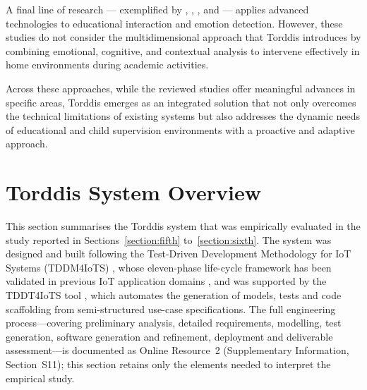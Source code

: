 A final line of research --- exemplified by \cite{Kulkarni2023}, \cite{Enadula2021}, \cite{Ozdamli2022}, and \cite{Warren2015Brief} --- applies advanced technologies to educational interaction and emotion detection. However, these studies do not consider the multidimensional approach that Torddis introduces by combining emotional, cognitive, and contextual analysis to intervene effectively in home environments during academic activities.

Across these approaches, while the reviewed studies offer meaningful advances in specific areas, Torddis emerges as an integrated solution that not only overcomes the technical limitations of existing systems but also addresses the dynamic needs of educational and child supervision environments with a proactive and adaptive approach.


\section{Torddis System Overview}
\label{section:fourth}
This section summarises the Torddis system that was empirically evaluated in the study reported in Sections~\ref{section:fifth} to~\ref{section:sixth}. The system was designed and built following the Test-Driven Development Methodology for IoT Systems (TDDM4IoTS) \citep{Guerrero-Ulloa2020TDDM4IoTS}, whose eleven-phase life-cycle framework has been validated in previous IoT application domains \citep{Guerrero-Ulloa2023Nawi,Guerrero2023Agile}, and was supported by the TDDT4IoTS tool \citep{Guerrero2024Test}, which automates the generation of models, tests and code scaffolding from semi-structured use-case specifications. The full engineering process---covering preliminary analysis, detailed requirements, modelling, test generation, software generation and refinement, deployment and deliverable assessment---is documented as Online Resource~2 (Supplementary Information, Section~S11); this section retains only the elements needed to interpret the empirical study.

